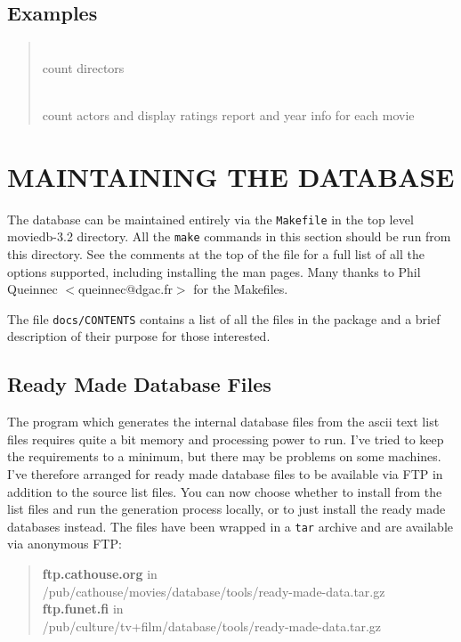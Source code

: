 \subsection{Examples}

\begin{quotation}
 \\
count directors

 \\
count actors and display ratings report and year info for each movie
\end{quotation}

\clearpage
\section{\label{mntng}MAINTAINING THE DATABASE}

The database can be maintained entirely via the {\tt Makefile} in the top 
level
moviedb-3.2 directory. All the {\tt make} commands in this section should 
be run 
from this directory. See the comments at the top of the file for a full 
list 
of all the options supported, including installing the man pages. Many 
thanks 
to Phil Queinnec $<$queinnec@dgac.fr$>$ for the Makefiles.

The file {\tt docs/CONTENTS} contains a list of all the files in the 
package and a
brief description of their purpose for those interested.

\subsection{\label{rmdf}Ready Made Database Files}

The program which generates the internal database files from the ascii text
list files requires quite a bit memory and processing power to run. I've 
tried
to keep the requirements to a minimum, but there may be problems on some
machines. I've therefore arranged for ready made database files to be 
available via FTP in addition to the source list files. You can now choose
whether to install from the list files and run the generation process 
locally,
or to just install the ready made databases instead. The files have been
wrapped in a {\tt tar} archive and are available via anonymous FTP:
\begin{quote}
{\bf ftp.cathouse.org} in\\
/pub/cathouse/movies/database/tools/ready-made-data.tar.gz\\
{\bf ftp.funet.fi} in\\
/pub/culture/tv+film/database/tools/ready-made-data.tar.gz
\end{quote}

